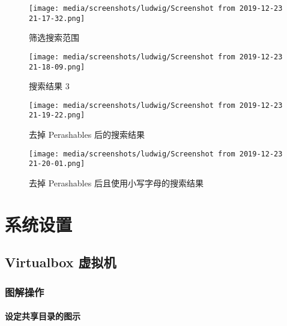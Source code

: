 \documentclass[
    11pt,
    cite=authoryear,
    device=phone,
    lang=cn,
    mode=simple,
    result=answer,
    toc=onecol,
]{elegantbook_sierxue}
\begin{document}
\begin{figure}[!htbp]
  \centering
  \texttt{[image: media/screenshots/ludwig/Screenshot from 2019-12-23 21-17-32.png]}
  \caption{筛选搜索范围}%
  \label{fig:ludwig-filter}
\end{figure}

\begin{figure}[!htbp]
  \centering
  \texttt{[image: media/screenshots/ludwig/Screenshot from 2019-12-23 21-18-09.png]}
  \caption{搜索结果 3}%
  \label{fig:ludwig-result-3}
\end{figure}

\begin{figure}[!htbp]
  \centering
  \texttt{[image: media/screenshots/ludwig/Screenshot from 2019-12-23 21-19-22.png]}
  \caption{去掉 Perashables 后的搜索结果}%
  \label{fig:ludwig-result-4}
\end{figure}

\begin{figure}[!htbp]
  \centering
  \texttt{[image: media/screenshots/ludwig/Screenshot from
  2019-12-23 21-20-01.png]}
  \caption{去掉 Perashables 后且使用小写字母的搜索结果}%
  \label{fig:ludwig-result-5}
\end{figure}


%

\appendix

\chapter{系统设置}%
\label{cha:settings-system-a}

\section{Virtualbox 虚拟机}

\subsection{图解操作}%
\label{sub:vbox-graphic-illustration}

\subsubsection{设定共享目录的图示}%
\label{ssub:vbox-set-share-folder-a}
\end{document}
